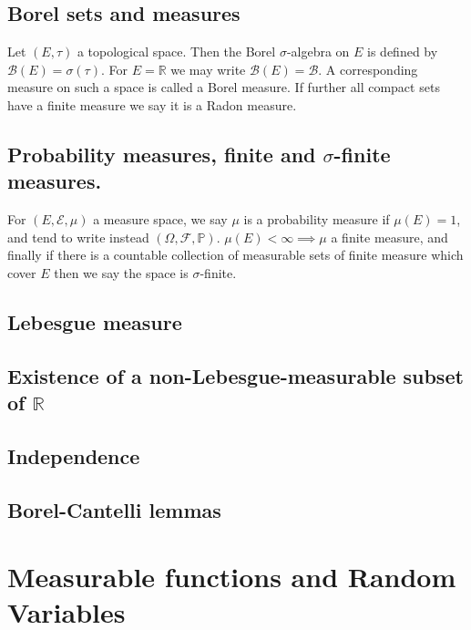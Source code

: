 \documentclass{article}
\begin{document}
\subsection{Borel sets and measures}
Let $(E,\tau)$ a topological space.  Then the Borel $\sigma$-algebra on $E$ is defined by $\mathcal{B}(E)=\sigma(\tau)$.  For $E=\mathbb R$ we may write $\mathcal B(E)=\mathcal{B}$.  A corresponding measure on such a space is called a Borel measure.  If further all compact sets have a finite measure we say it is a Radon measure.
\subsection{Probability measures, finite and $\sigma$-finite measures.}
For $(E,\mathcal E,\mu)$ a measure space, we say $\mu$ is a probability measure if $\mu(E)=1$, and tend to write instead $(\Omega,\mathcal{F},\mathbb{P})$.  $\mu(E)<\infty\implies\mu$ a finite measure, and finally if there is a countable collection of measurable sets of finite measure which cover $E$ then we say the space is $\sigma$-finite.
\subsection{Lebesgue measure}
\subsection{Existence of a non-Lebesgue-measurable subset of $\mathbb{R}$}
\subsection{Independence}
\subsection{Borel-Cantelli lemmas}
\section{Measurable functions and Random Variables}
\end{document}
